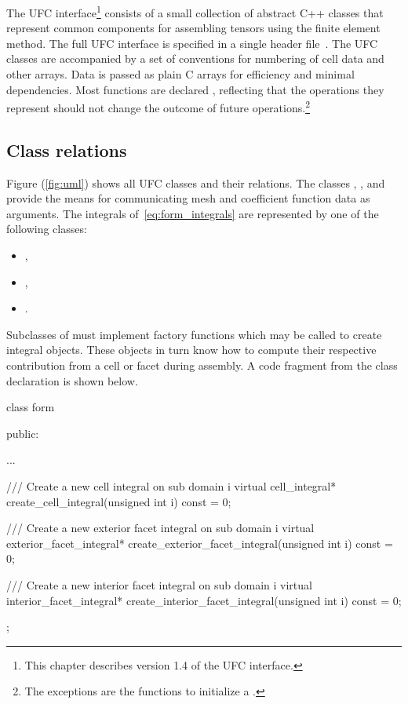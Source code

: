The UFC interface\footnote{This chapter describes version 1.4 of the
  UFC interface.} consists of a small collection of abstract C++
classes that represent common components for assembling tensors using
the finite element method. The full UFC interface is specified in a
single header file~. The UFC classes are accompanied by a
set of conventions for numbering of cell data and other arrays. Data
is passed as plain C arrays for efficiency and minimal dependencies.
Most functions are declared , reflecting that the
operations they represent should not change the outcome of future
operations.\footnote{The exceptions are the functions to initialize a
  .}

\subsection{Class relations}

Figure (\ref{fig:uml}) shows all UFC classes and their relations. The
classes , , and  provide the means
for communicating mesh and coefficient function data as arguments.
The integrals of~\eqref{eq:form_integrals} are represented by one of
the following classes:
\begin{itemize}
\item
  ,
\item
  ,
\item
  .
\end{itemize}
Subclasses of  must implement factory functions which may be
called to create integral objects. These objects in turn know how to
compute their respective contribution from a cell or facet during
assembly. A code fragment from the  class declaration is
shown below.

\begin{c++}
class form
{
public:

  ...

  /// Create a new cell integral on sub domain i
  virtual cell_integral* create_cell_integral(unsigned int i) const = 0;

  /// Create a new exterior facet integral on sub domain i
  virtual exterior_facet_integral*
  create_exterior_facet_integral(unsigned int i) const = 0;

  /// Create a new interior facet integral on sub domain i
  virtual interior_facet_integral*
  create_interior_facet_integral(unsigned int i) const = 0;

};
\end{c++}

